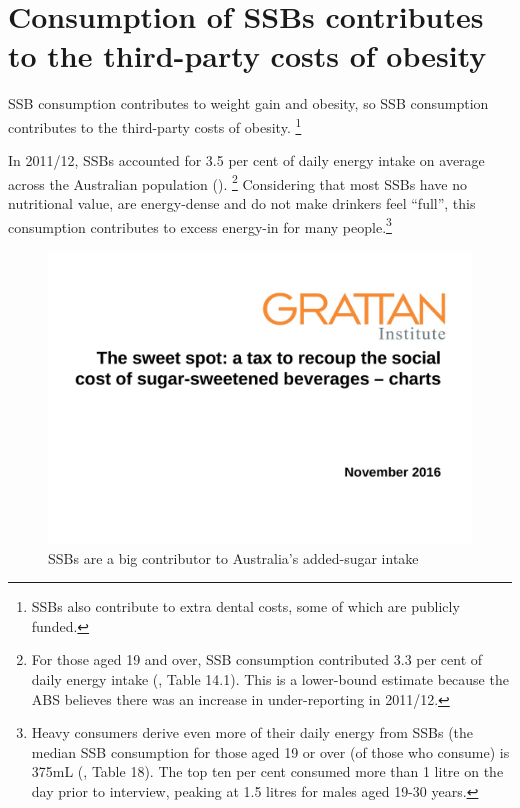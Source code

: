 \documentclass[embargoed]{grattan}
\begin{document}
\section{Consumption of SSBs contributes to the third-party costs of obesity}\label{sec:consumption-of-ssbs-contributes-to-the-third-party-costs-of-obesity}

SSB consumption contributes to weight gain and obesity, so SSB consumption contributes to the third-party costs of obesity.%
\footnote{SSBs also contribute to extra dental costs, some of which are publicly funded.}

In 2011/12, SSBs accounted for 3.5 per cent of daily energy intake on average across the Australian population ().%
\footnote{For those aged 19 and over, SSB consumption contributed 3.3 per cent of daily energy intake (\textcite{ABS20144364055007AustralianHealth}, Table 14.1).
This is a lower-bound estimate because the ABS believes there was an increase in under-reporting in 2011/12.} Considering that most SSBs have no nutritional value, are energy-dense and do not make drinkers feel ``full'', this consumption contributes to excess energy-in for many people.\footnote{Heavy consumers derive even more of their daily energy from SSBs (the median SSB consumption for those aged 19 or over (of those who consume) is 375mL (\textcite{ABS2013436405503AustralianHealth}, Table 18).
The top ten per cent consumed more than 1 litre on the day prior to interview, peaking at 1.5 litres for males aged 19-30 years.}

\begin{figure}
\caption{SSBs are a big contributor to Australia's added-sugar intake} \label{fig:SSBs-are-a-big-contributor-to-Austs-added-sugar-intake}

\includegraphics[page=10]{atlas/ObesityCharts}

\end{figure}
\end{document}

